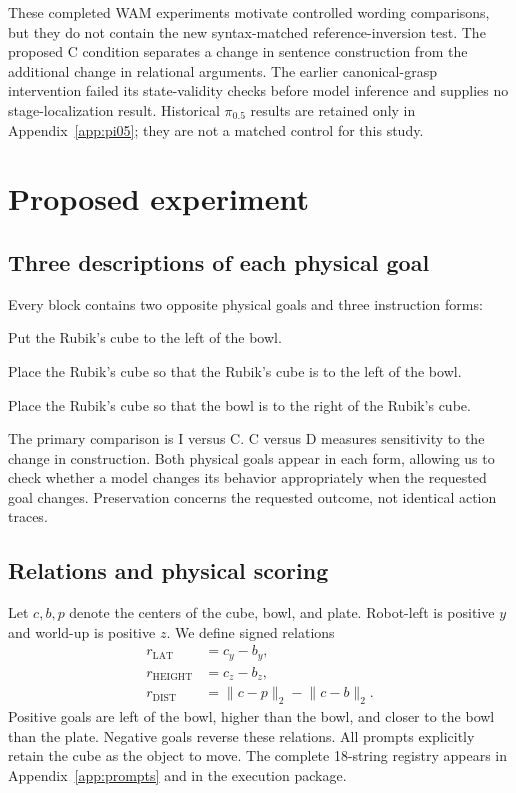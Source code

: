 \documentclass[11pt]{article}
\begin{document}
These completed WAM experiments motivate controlled wording comparisons, but they do not contain the new syntax-matched reference-inversion test. The proposed C condition separates a change in sentence construction from the additional change in relational arguments. The earlier canonical-grasp intervention failed its state-validity checks before model inference and supplies no stage-localization result. Historical $\pi_{0.5}$ results are retained only in Appendix~\ref{app:pi05}; they are not a matched control for this study.

\section{Proposed experiment}
\subsection{Three descriptions of each physical goal}
Every block contains two opposite physical goals and three instruction forms:
\begin{description}[font=\normalfont\bfseries]
\item[D: direct.] Put the Rubik's cube to the left of the bowl.
\item[C: subject-first clause.] Place the Rubik's cube so that the Rubik's cube is to the left of the bowl.
\item[I: inverted clause.] Place the Rubik's cube so that the bowl is to the right of the Rubik's cube.
\end{description}
The primary comparison is I versus C. C versus D measures sensitivity to the change in construction. Both physical goals appear in each form, allowing us to check whether a model changes its behavior appropriately when the requested goal changes. Preservation concerns the requested outcome, not identical action traces.

\subsection{Relations and physical scoring}
Let $c,b,p$ denote the centers of the cube, bowl, and plate. Robot-left is positive $y$ and world-up is positive $z$. We define signed relations
\begin{align}
r_{\mathrm{LAT}} &= c_y-b_y,\\
r_{\mathrm{HEIGHT}} &= c_z-b_z,\\
r_{\mathrm{DIST}} &= \lVert c-p\rVert_2-\lVert c-b\rVert_2.
\end{align}
Positive goals are left of the bowl, higher than the bowl, and closer to the bowl than the plate. Negative goals reverse these relations. All prompts explicitly retain the cube as the object to move. The complete 18-string registry appears in Appendix~\ref{app:prompts} and in the execution package.
\end{document}
